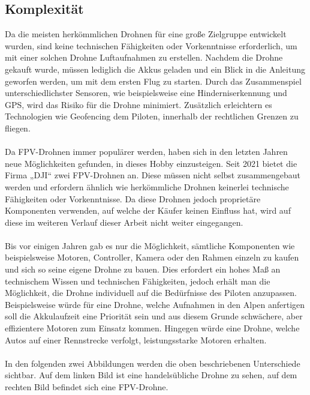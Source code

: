     \subsection[Komplexität]{Komplexität}
        Da die meisten herkömmlichen Drohnen für eine große Zielgruppe entwickelt wurden, sind keine technischen Fähigkeiten oder Vorkenntnisse erforderlich, um mit einer solchen Drohne Luftaufnahmen zu erstellen. Nachdem die Drohne gekauft wurde, müssen lediglich die Akkus geladen und ein Blick in die Anleitung geworfen werden, um mit dem ersten Flug zu starten. Durch das Zusammenspiel unterschiedlichster Sensoren, wie beispielsweise eine Hinderniserkennung und GPS, wird das Risiko für die Drohne minimiert. Zusätzlich erleichtern es Technologien wie Geofencing dem Piloten, innerhalb der rechtlichen Grenzen zu fliegen.
        \\ \\
        Da FPV-Drohnen immer populärer werden, haben sich in den letzten Jahren neue Möglichkeiten gefunden, in dieses Hobby einzusteigen. Seit 2021 bietet die Firma „DJI“ zwei FPV-Drohnen an. Diese müssen nicht selbst zusammengebaut werden und erfordern ähnlich wie herkömmliche Drohnen keinerlei technische Fähigkeiten oder Vorkenntnisse. Da diese Drohnen jedoch proprietäre Komponenten verwenden, auf welche der Käufer keinen Einfluss hat, wird auf diese im weiteren Verlauf dieser Arbeit nicht weiter eingegangen.
        \\ \\
        Bis vor einigen Jahren gab es nur die Möglichkeit, sämtliche Komponenten wie beispielsweise Motoren, Controller, Kamera oder den Rahmen einzeln zu kaufen und sich so seine eigene Drohne zu bauen. Dies erfordert ein hohes Maß an technischem Wissen und technischen Fähigkeiten, jedoch erhält man die Möglichkeit, die Drohne individuell auf die Bedürfnisse des Piloten anzupassen. Beispielsweise würde für eine Drohne, welche Aufnahmen in den Alpen anfertigen soll die Akkulaufzeit eine Priorität sein und aus diesem Grunde schwächere, aber effizientere Motoren zum Einsatz kommen. Hingegen würde eine Drohne, welche Autos auf einer Rennstrecke verfolgt, leistungsstarke Motoren erhalten.
        \\ \\
        In den folgenden zwei Abbildungen werden die oben beschriebenen Unterschiede sichtbar. Auf dem linken Bild ist eine handelsübliche Drohne zu sehen, auf dem rechten Bild befindet sich eine FPV-Drohne.

